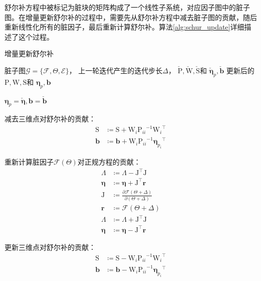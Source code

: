 舒尔补方程中被标记为脏块的矩阵构成了一个线性子系统，对应因子图中的脏子图。在增量更新舒尔补的过程中，需要先从舒尔补方程中减去脏子图的贡献，随后重新线性化所有的脏因子，最后重新计算舒尔补。算法\ref{alg:schur_update}详细描述了这个过程。

\begin{algorithm}
\caption{增量更新舒尔补}
\begin{algorithmic}[1]
    \REQUIRE 脏子图$\mathcal{G}=\{\mathcal{F},\Theta,\mathcal{E}\}$，
             上一轮迭代产生的迭代步长$\Delta$，
             $\check{\mathrm{P}},\check{\mathrm{W}},\check{\mathrm{S}}$和
             $\check{\bm{\eta}}_p,\check{\bm{b}}$
    \ENSURE 更新后的
            $\mathrm{P},\mathrm{W},\mathrm{S}$和
            $\bm{\eta}_p,\bm{b}$

    \STATE $\bm{\eta}_p=\check{\bm{\eta}},\bm{b}=\check{\bm{b}}$

        \STATE 减去三维点对舒尔补的贡献：
        \[\begin{aligned}
                \mathrm{S} &\coloneqq \mathrm{S} + \mathrm{W}_i{\mathrm{P}_{ii}}^{-1}   {\mathrm{W}_i}^\top \\
                \bm{b}     &\coloneqq \bm{b}     + \mathrm{W}_i{\mathrm{P}_{ii}}^{-1}{\bm{\eta}_{p_i}}^\top
        \end{aligned}\]
    \ENDFOR

    \STATE 重新计算脏因子$\mathcal{F}(\Theta)$对正规方程的贡献：
    \[\begin{aligned}
            \Lambda    &\coloneqq \Lambda - \mathrm{J}^\top \mathrm{J}                                   \\
            \bm{\eta}  &\coloneqq \bm{\eta} + \mathrm{J}^\top \bm{r}                                     \\
            \mathrm{J} &\coloneqq \frac{\partial{\mathcal{F}(\Theta+\Delta)}}{\partial{(\Theta+\Delta)}} \\
            \bm{r}     &\coloneqq \mathcal{F}(\Theta+\Delta)                                             \\
            \Lambda    &\coloneqq \Lambda + \mathrm{J}^\top \mathrm{J}                                   \\
            \bm{\eta}  &\coloneqq \bm{\eta} - \mathrm{J}^\top \bm{r}
    \end{aligned}\]

        \STATE 更新三维点对舒尔补的贡献：
        \[\begin{aligned}
                \mathrm{S} &\coloneqq \mathrm{S} - \mathrm{W}_i{\mathrm{P}_{ii}}^{-1}   {\mathrm{W}_i}^\top \\
                \bm{b}     &\coloneqq \bm{b}     - \mathrm{W}_i{\mathrm{P}_{ii}}^{-1}{\bm{\eta}_{p_i}}^\top
        \end{aligned}\]
    \ENDFOR

\end{algorithmic}
\label{alg:schur_update}
\end{algorithm}

